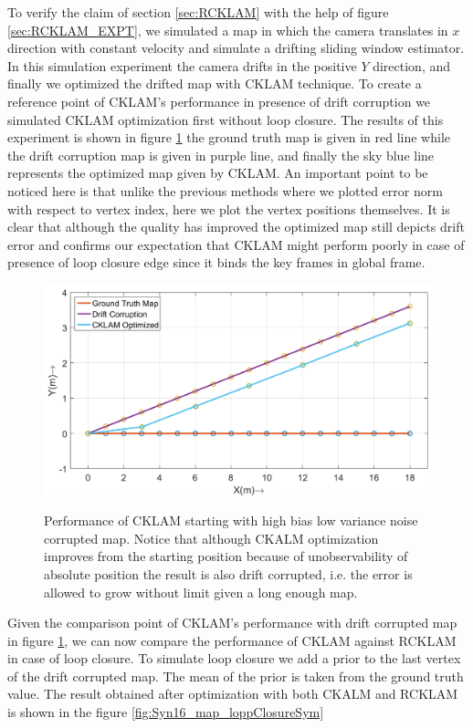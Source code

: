   To verify the claim of section \ref{sec:RCKLAM} with the help of figure \ref{sec:RCKLAM_EXPT}, we simulated a map in which the camera translates in $x$ direction with constant velocity and simulate a drifting sliding window estimator. In this simulation experiment the camera drifts in the positive $Y$ direction, and finally we optimized the drifted map with CKLAM technique. To create a reference point of CKLAM's performance in presence of drift corruption we simulated CKLAM optimization first without loop closure. The results of this experiment is shown in figure \ref{fig:Syn16_map_cklam} the ground truth map is given in red line while the drift corruption map is given in purple line, and finally the sky blue line represents the optimized map given by CKLAM. An important point to be noticed here is that unlike the previous methods where we plotted error norm with respect to vertex index, here we plot the vertex positions themselves. It is clear that although the quality has improved the optimized map still depicts drift error and confirms our expectation that CKLAM might perform poorly in case of presence of loop closure edge since it binds the key frames in global frame.
  
\begin{figure}
  \centering
    \includegraphics[width=1.00\textwidth]{images/Syn16_map_cklam.png}
  \label{fig:Syn16_map_cklam}
  \caption{Performance of CKLAM starting with high bias low variance noise corrupted map. Notice that although CKALM optimization improves from the starting position because of unobservability of absolute position the result is also drift corrupted, i.e. the error is allowed to grow without limit given a long enough map.}
\end{figure}
  
  Given the comparison point of CKLAM's performance with drift corrupted map in figure \ref{fig:Syn16_map_cklam}, we can now compare the performance of CKLAM against RCKLAM in case of loop closure. To simulate loop closure we add a prior to the last vertex of the drift corrupted map. The mean of the prior is taken from the ground truth value. The result obtained after optimization with both CKALM and RCKLAM is shown in the figure \ref{fig:Syn16_map_loppClosureSym}
  

